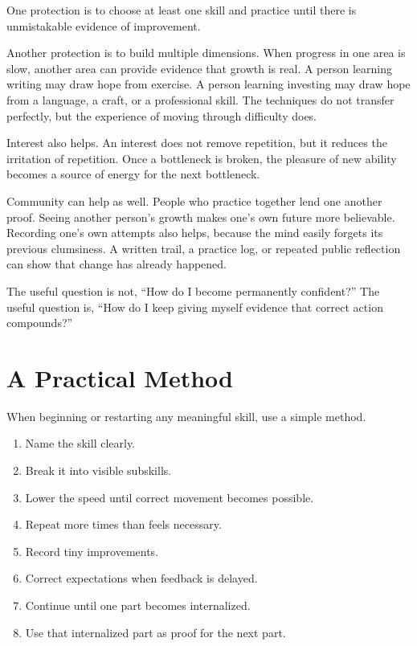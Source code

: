 One protection is to choose at least one skill and practice until there is unmistakable evidence of improvement.

Another protection is to build multiple dimensions. When progress in one area is slow, another area can provide evidence that growth is real. A person learning writing may draw hope from exercise. A person learning investing may draw hope from a language, a craft, or a professional skill. The techniques do not transfer perfectly, but the experience of moving through difficulty does.

Interest also helps. An interest does not remove repetition, but it reduces the irritation of repetition. Once a bottleneck is broken, the pleasure of new ability becomes a source of energy for the next bottleneck.

Community can help as well. People who practice together lend one another proof. Seeing another person's growth makes one's own future more believable. Recording one's own attempts also helps, because the mind easily forgets its previous clumsiness. A written trail, a practice log, or repeated public reflection can show that change has already happened.

The useful question is not, ``How do I become permanently confident?'' The useful question is, ``How do I keep giving myself evidence that correct action compounds?''

\section*{A Practical Method}

When beginning or restarting any meaningful skill, use a simple method.

\begin{enumerate}
\item Name the skill clearly.
\item Break it into visible subskills.
\item Lower the speed until correct movement becomes possible.
\item Repeat more times than feels necessary.
\item Record tiny improvements.
\item Correct expectations when feedback is delayed.
\item Continue until one part becomes internalized.
\item Use that internalized part as proof for the next part.
\end{enumerate}

